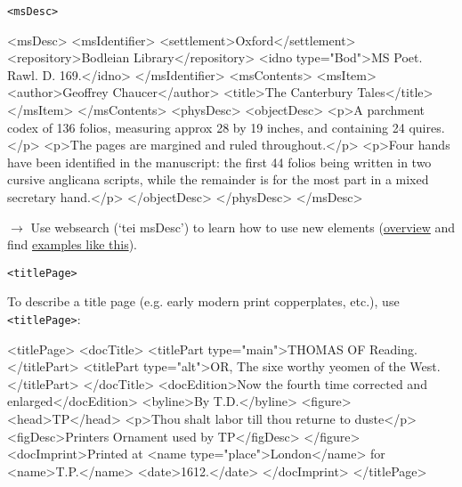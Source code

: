 \begin{frame}[fragile]{\texttt{<msDesc>}}

\begin{xmlcode}
<msDesc>
 <msIdentifier>
  <settlement>Oxford</settlement>
  <repository>Bodleian Library</repository>
  <idno type="Bod">MS Poet. Rawl. D. 169.</idno>
 </msIdentifier>
 <msContents>
  <msItem>
   <author>Geoffrey Chaucer</author>
   <title>The Canterbury Tales</title>
  </msItem>
 </msContents>
 <physDesc>
  <objectDesc>
   <p>A parchment codex of 136 folios, measuring approx
       28 by 19 inches, and containing 24 quires.</p>
   <p>The pages are margined and ruled throughout.</p>
   <p>Four hands have been identified in the manuscript: the first 44
       folios being written in two cursive anglicana scripts, while the
       remainder is for the most part in a mixed secretary hand.</p>
  </objectDesc>
 </physDesc>
</msDesc>
\end{xmlcode}

$\to$ Use websearch (`tei msDesc') to learn how to use new elements (\href{https://tei-c.org/release/doc/tei-p5-doc/en/html/ref-msDesc.html}{overview} and find \href{https://tei-c.org/release/doc/tei-p5-doc/en/html/examples-msDesc.html}{examples like this}).

\end{frame}




\begin{frame}[fragile]{\texttt{<titlePage>}}

To describe a title page (e.g. early modern print copperplates, etc.), use \texttt{<titlePage>}:
\begin{xmlcode}
<titlePage>
 <docTitle>
  <titlePart type="main">THOMAS OF Reading.</titlePart>
  <titlePart type="alt">OR, The sixe worthy yeomen of the West.</titlePart>
 </docTitle>
 <docEdition>Now the fourth time corrected and enlarged</docEdition>
 <byline>By T.D.</byline>
 <figure>
  <head>TP</head>
  <p>Thou shalt labor till thou returne to duste</p>
  <figDesc>Printers Ornament used by TP</figDesc>
 </figure>
 <docImprint>Printed at <name type="place">London</name> for <name>T.P.</name>
  <date>1612.</date>
 </docImprint>
</titlePage>
\end{xmlcode}

\end{frame}




